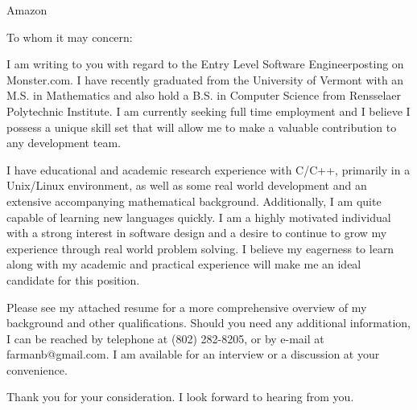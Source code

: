 \documentclass{letter}
\begin{document}
\newcommand{\posting}{Entry Level Software Engineer}
\newcommand{\loc}{Monster.com}
\newcommand{\employer}{Amazon}

\begin{letter}{\employer}
  \opening{To whom it may concern:}
  
  I am writing to you with regard to the \posting posting on \loc.  
  I have recently graduated from the University of Vermont with an M.S. in Mathematics and also hold a B.S. in Computer Science from Rensselaer Polytechnic Institute.
  I am currently seeking full time employment and I believe I possess a unique skill set that will allow me to make a valuable contribution to any development team.

  I have educational and academic research experience with C/C++, primarily in a Unix/Linux environment, as well as some real world development and an extensive accompanying mathematical background.
  Additionally, I am quite capable of learning new languages quickly.
  I am a highly motivated individual with a strong interest in software design and a desire to continue to grow my experience through real world problem solving.  
  I believe my eagerness to learn along with my academic and practical experience will make me an ideal candidate for this position.

  Please see my attached resume for a more comprehensive overview of my background and other qualifications.  
  Should you need any additional information, I can be reached by telephone at (802) 282-8205, or by e-mail at farmanb@gmail.com.  
  I am available for an interview or a discussion at your convenience.  
  
  Thank you for your consideration.  
  I look forward to hearing from you.
  


\end{letter}
\end{document}
